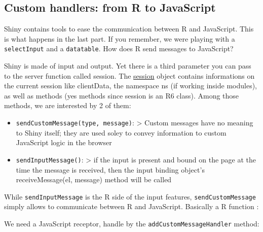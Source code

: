 \documentclass[]{book}
\newenvironment{Shaded}{\begin{snugshade}}{\end{snugshade}}
\newcommand{\ControlFlowTok}[1]{\textcolor[rgb]{0.13,0.29,0.53}{\textbf{#1}}}
\newcommand{\DataTypeTok}[1]{\textcolor[rgb]{0.13,0.29,0.53}{#1}}
\newcommand{\KeywordTok}[1]{\textcolor[rgb]{0.13,0.29,0.53}{\textbf{#1}}}
\newcommand{\NormalTok}[1]{#1}
\newcommand{\OperatorTok}[1]{\textcolor[rgb]{0.81,0.36,0.00}{\textbf{#1}}}
\newcommand{\StringTok}[1]{\textcolor[rgb]{0.31,0.60,0.02}{#1}}
\providecommand{\tightlist}{%
  \setlength{\itemsep}{0pt}\setlength{\parskip}{0pt}}
\begin{document}
\hypertarget{custom-handlers-from-r-to-javascript}{%
\subsection{Custom handlers: from R to JavaScript}\label{custom-handlers-from-r-to-javascript}}

Shiny contains tools to ease the communication between R and JavaScript. This is what happens in the last part. If you remember, we were playing with a \texttt{selectInput} and a \texttt{datatable}. How does R send messages to JavaScript?

Shiny is made of input and output. Yet there is a third parameter you can pass to the server function called session. The \href{https://shiny.rstudio.com/reference/shiny/1.4.0/session.html}{session} object contains informations on the current session like clientData, the namespace ns (if working inside modules), as well as methods (yes methods since session is an R6 class). Among those methods, we are interested by 2 of them:

\begin{itemize}
\tightlist
\item
  \texttt{sendCustomMessage(type,\ message)}: \textgreater{} Custom messages have no meaning to Shiny itself; they are used soley to convey information to custom JavaScript logic in the browser
\item
  \texttt{sendInputMessage()}: \textgreater{} if the input is present and bound on the page at the time the message is received, then the input binding object's receiveMessage(el, message) method will be called
\end{itemize}

While \texttt{sendInputMessage} is the R side of the input features, \texttt{sendCustomMessage} simply allows to communicate between R and JavaScript.
Basically a R function :

\begin{Shaded}
\end{Shaded}

We need a JavaScript receptor, handle by the \texttt{addCustomMessageHandler} method:
\end{document}
